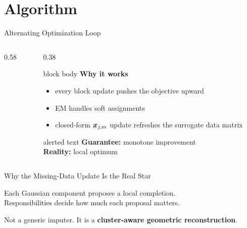 \section{Algorithm}

\begin{frame}[shrink=5]{Alternating Optimization Loop}
    \begin{columns}[T,onlytextwidth]
        \begin{column}{0.58\textwidth}
            
        \end{column}
        \begin{column}{0.38\textwidth}
            \small
            \begin{beamercolorbox}[sep=0.7em, rounded=true, shadow=true]{block body}
                \textbf{Why it works}
                \begin{itemize}
                    \item every block update pushes the objective upward
                    \item EM handles soft assignments
                    \item closed-form \(\bm{x}_{j,m}\) update refreshes the surrogate data matrix
                \end{itemize}
            \end{beamercolorbox}

            \vspace{0.25cm}
            \begin{beamercolorbox}[sep=0.65em, rounded=true, shadow=true]{alerted text}
                \textbf{Guarantee:} monotone improvement\\
                \textbf{Reality:} local optimum
            \end{beamercolorbox}
        \end{column}
    \end{columns}
\end{frame}


\begin{frame}[shrink=5]{Why the Missing-Data Update Is the Real Star}
    \begin{center}
        {\normalsize
        Each Gaussian component proposes a local completion.}\\[0.08cm]
        {\normalsize
        Responsibilities decide how much each proposal matters.}
    \end{center}

    \vspace{0.08cm}
    {\centering
        \par
    }

    \vspace{0.05cm}
    \begin{center}
        \normalsize
        \textcolor{alertRed}{Not a generic imputer.}
        It is a \textbf{cluster-aware geometric reconstruction}.
    \end{center}
\end{frame}
